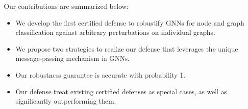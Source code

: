\vspace{+0.05in}
 Our contributions are summarized below: 
\begin{itemize}[leftmargin=*]

\vspace{-2mm}
\item We develop the first certified defense to robustify GNNs for node and graph classification against arbitrary perturbations on individual graphs. 

\vspace{-2mm}
\item We propose two strategies to realize our defense that leverages the 
unique message-passing mechanism in GNNs.  

\vspace{-2mm}
\item Our robustness guarantee  
is accurate with probability 1. 

\vspace{-2mm}
\item Our defense treat existing certified defenses as special cases, as well as significantly outperforming them. 
\vspace{-4mm}
\end{itemize}



